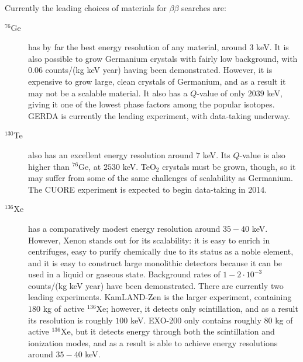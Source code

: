 Currently the leading choices of materials for $\beta\beta$ searches are:~\cite{RMPbb0n}
\begin{description}
\item[$^{76}$Ge] has by far the best energy resolution of any material, around $3$ keV.  It is also possible to grow Germanium crystals with fairly low background, with $0.06$ counts/(kg keV year) having been demonstrated.  However, it is expensive to grow large, clean crystals of Germanium, and as a result it may not be a scalable material.  It also has a $Q$-value of only $2039$ keV, giving it one of the lowest phase factors among the popular isotopes.  GERDA is currently the leading experiment, with data-taking underway.
\item[$^{130}$Te] also has an excellent energy resolution around $7$ keV.  Its $Q$-value is also higher than $^{76}$Ge, at $2530$ keV.  TeO$_2$ crystals must be grown, though, so it may suffer from some of the same challenges of scalability as Germanium.  The CUORE experiment is expected to begin data-taking in 2014.
\item[$^{136}$Xe] has a comparatively modest energy resolution around $35-40$ keV.  However, Xenon stands out for its scalability: it is easy to enrich in centrifuges, easy to purify chemically due to its status as a noble element, and it is easy to construct large monolithic detectors because it can be used in a liquid or gaseous state.  Background rates of $1-2\cdot 10^{-3}$ counts/(kg keV year) have been demonstrated.  There are currently two leading experiments.  KamLAND-Zen is the larger experiment, containing $180$ kg of active $^{136}$Xe; however, it detects only scintillation, and as a result its resolution is roughly $100$ keV.  EXO-200 only contains roughly $80$ kg of active $^{136}$Xe, but it detects energy through both the scintillation and ionization modes, and as a result is able to achieve energy resolutions around $35-40$ keV.
\end{description}

